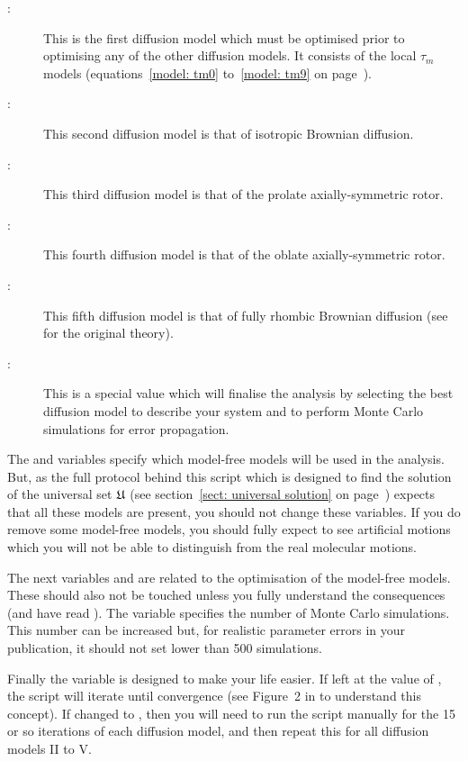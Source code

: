 \begin{htmlonly}
\begin{htmlonly}
\begin{description}
\item[:]  This is the first diffusion model which must be optimised prior to optimising any of the other diffusion models.  It consists of the local $\tau_m$ models (equations~\ref{model: tm0} to~\ref{model: tm9} on page~\pageref{model: tm0}).
\item[:]  This second diffusion model is that of isotropic Brownian diffusion.
\item[:]  This third diffusion model is that of the prolate axially-symmetric rotor.
\item[:]  This fourth diffusion model is that of the oblate axially-symmetric rotor.
\item[:]  This fifth diffusion model is that of fully rhombic Brownian diffusion (see \citet{Perrin34,Perrin36} for the original theory).
\item[:]  This is a special value which will finalise the analysis by selecting the best diffusion model to describe your system and to perform Monte Carlo simulations for error propagation.
\end{description}

The  and   variables specify which model-free models will be used in the analysis.  But, as the full protocol behind this script which is designed to find the solution of the universal set $\mathfrak{U}$ (see section~\ref{sect: universal solution} on page~\pageref{sect: universal solution}) expects that all these models are present, you should not change these variables.  If you do remove some model-free models, you should fully expect to see artificial motions which you will not be able to distinguish from the real molecular motions.

The next variables  and  are related to the optimisation of the model-free models.  These should also not be touched unless you fully understand the consequences (and have read \citet{dAuvergneGooley08a}).  The variable  specifies the number of Monte Carlo simulations.  This number can be increased but, for realistic parameter errors in your publication, it should not set lower than 500 simulations.

Finally the  variable is designed to make your life easier.  If left at the value of , the script will iterate until convergence (see Figure~2 in \citet{dAuvergneGooley08b} to understand this concept).  If changed to , then you will need to run the script manually for the 15 or so iterations of each diffusion model, and then repeat this for all diffusion models II to V.



\end{htmlonly}
\end{htmlonly}
